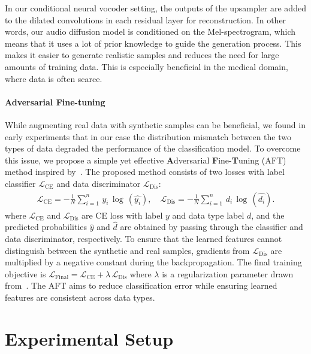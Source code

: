 \documentclass{article}
\begin{document}
In our conditional neural vocoder setting, the outputs of the upsampler are added to the dilated convolutions in each residual layer for reconstruction. In other words, our audio diffusion model is conditioned on the Mel-spectrogram, which means that it uses a lot of prior knowledge to guide the generation process. This makes it easier to generate realistic samples and reduces the need for large amounts of training data. This is especially beneficial in the medical domain, where data is often scarce.








\paragraph{Adversarial Fine-tuning} While augmenting real data with synthetic samples can be beneficial, we found in early experiments that in our case the distribution mismatch between the two types of data degraded the performance of the classification model.
To overcome this issue, we propose a simple yet effective \textbf{A}dversarial \textbf{F}ine-\textbf{T}uning (AFT) method inspired by~\cite{ganin2016domain}. The proposed method consists of two losses with label classifier $\mathcal{L}_\text{CE}$ and data discriminator $\mathcal{L}_\text{Dis}$:
\begin{align}\label{eq:sdat1} \mathcal{L}_{\text{CE}} \! = -\frac{1}{N}\sum_{i=1}^n\! \, y_{i}\! \, \log \, \!(\hat{y_{i}}), \quad \mathcal{L}_{\text{Dis}} \! = -\frac{1}{N}\sum_{i=1}^n\! \, d_{i}\! \, \log \, \!(\hat{d_{i}}).
\end{align}
where $\mathcal{L}_{\text{CE}}$ and $\mathcal{L}_{\text{Dis}}$ are CE loss with label $y$ and data type label $d$, and the predicted probabilities $\hat{y}$ and $\hat{d}$ are obtained by passing through the classifier and data discriminator, respectively. To ensure that the learned features cannot distinguish between the synthetic and real samples, gradients from $\mathcal{L}_{\text{Dis}}$ are multiplied by a negative constant during the backpropagation. The final training objective is $\mathcal{L}_{\text{Final}} = \mathcal{L}_{\text{CE}} + \lambda \, \! \mathcal{L}_{\text{Dis}}$ where $\lambda$ is a regularization parameter drawn from~\cite{ganin2016domain}. The AFT aims to reduce classification error while ensuring learned features are consistent across data types.


\section{Experimental Setup}
\end{document}
